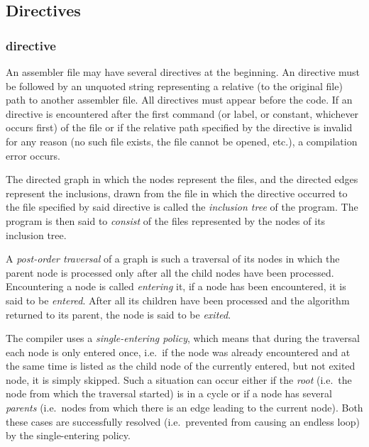 \subsection{Directives}
\subsubsection{ directive}

\vspace{-0.2cm}

An assembler file may have several  directives at the beginning.
An  directive must be followed by an unquoted string
representing a relative (to the original file) path to another assembler file.
All  directives must appear before the code.
If an  directive is encountered after the first command
(or label, or constant, whichever occurs first) of the file or if the
relative path specified by the directive is invalid for any reason
(no such file exists, the file cannot be opened, etc.),
a compilation error occurs.

The directed graph in which the nodes represent the files, and the directed
edges represent the inclusions, drawn from the file in which 
the  directive occurred to the file specified by said directive
is called the \textit{inclusion tree} of the program.
The program is then said to \textit{consist} of the files represented
by the nodes of its inclusion tree.

A \textit{post-order traversal} of a graph is such a traversal of its nodes
in which the parent node is processed only after all the child nodes have been
processed.
Encountering a node is called \textit{entering} it, if a node has been
encountered, it is said to be \textit{entered}.
After all its children have been processed and the algorithm returned
to its parent, the node is said to be \textit{exited}.

The  compiler uses a \textit{single-entering policy}, which
means that during the traversal each node is only entered once, i.e.\ if the node
was already encountered and at the same time is listed as the child node
of the currently entered, but not exited node, it is simply skipped.
Such a situation can occur either if the \textit{root} 
(i.e.\ the node from which the traversal started) is in a cycle or
if a node has several \textit{parents} (i.e.\ nodes from which there is
an edge leading to the current node).
Both these cases are successfully resolved (i.e.\ prevented from causing
an endless loop) by the single-entering policy.

